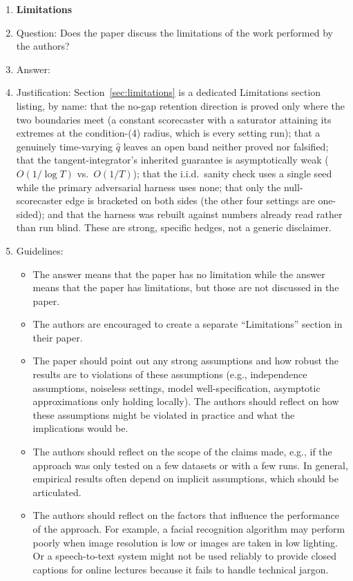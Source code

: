 \begin{enumerate}
\item {\bf Limitations}
    \item[] Question: Does the paper discuss the limitations of the work performed by the authors?
    \item[] Answer: \answerYes{}
    \item[] Justification: Section~\ref{sec:limitations} is a dedicated Limitations section listing, by name: that the no-gap retention direction is proved only where the two boundaries meet (a constant scorecaster with a saturator attaining its extremes at the condition-(4) radius, which is every setting run); that a genuinely time-varying $\hat q$ leaves an open band neither proved nor falsified; that the tangent-integrator's inherited guarantee is asymptotically weak ($O(1/\log T)$ vs.\ $O(1/T)$); that the i.i.d.\ sanity check uses a single seed while the primary adversarial harness uses none; that only the null-scorecaster edge is bracketed on both sides (the other four settings are one-sided); and that the harness was rebuilt against numbers already read rather than run blind. These are strong, specific hedges, not a generic disclaimer.
    \item[] Guidelines:
    \begin{itemize}
        \item The answer \answerNA{} means that the paper has no limitation while the answer \answerNo{} means that the paper has limitations, but those are not discussed in the paper.
        \item The authors are encouraged to create a separate ``Limitations'' section in their paper.
        \item The paper should point out any strong assumptions and how robust the results are to violations of these assumptions (e.g., independence assumptions, noiseless settings, model well-specification, asymptotic approximations only holding locally). The authors should reflect on how these assumptions might be violated in practice and what the implications would be.
        \item The authors should reflect on the scope of the claims made, e.g., if the approach was only tested on a few datasets or with a few runs. In general, empirical results often depend on implicit assumptions, which should be articulated.
        \item The authors should reflect on the factors that influence the performance of the approach. For example, a facial recognition algorithm may perform poorly when image resolution is low or images are taken in low lighting. Or a speech-to-text system might not be used reliably to provide closed captions for online lectures because it fails to handle technical jargon.

\end{itemize}
\end{enumerate}
